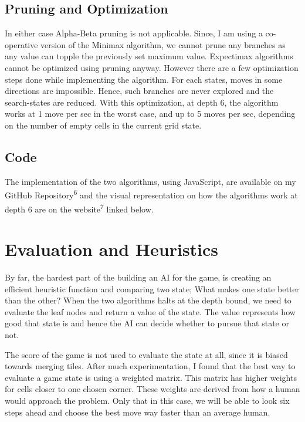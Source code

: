 \documentclass[english]{article}
\begin{document}
\subsection*{Pruning and Optimization}
 In either case Alpha-Beta pruning is not applicable. Since, I am using a co-operative version of the Minimax algorithm, we cannot prune any branches as any value can topple the previously set maximum value. Expectimax algorithms cannot be optimized using pruning anyway. However there are a few optimization steps done while implementing the algorithm. For each states, moves in some directions are impossible. Hence, such branches are never explored and the search-states are reduced. With this optimization, at depth 6, the algorithm works at 1 move per sec in the worst case, and up to 5 moves per sec, depending on the number of empty cells in the current grid state. 

\subsection*{Code}

The implementation of the two algorithms, using JavaScript, are available on my GitHub Repository\textsuperscript{6} and the visual representation on how the algorithms work at depth 6 are on the website\textsuperscript{7} linked below.

\section*{Evaluation and Heuristics}

By far, the hardest part of the building an AI for the game, is creating an efficient heuristic function and comparing two state; What makes one state better than the other? When the two algorithms halts at the depth bound, we need to evaluate the leaf nodes and return a value of the state. The value represents how good that state is and hence the AI can decide whether to pursue that state or not.

The score of the game is not used to evaluate the state at all, since it is biased towards merging tiles. After much experimentation, I found that the best way to evaluate a game state is using a weighted matrix. This matrix has higher weights for cells closer to one chosen corner. These weights are derived from how a human would approach the problem. Only that in this case, we will be able to look six steps ahead and choose the best move way faster than an average human.
\end{document}
